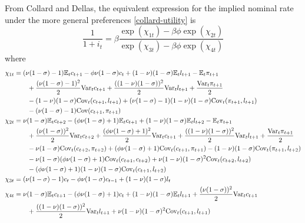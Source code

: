 From Collard and Dellas, the equivalent expression for the implied nominal rate under the more general preferences \eqref{collard-utility} is $$\frac{1}{1 + i_t} = \beta \frac{ \exp(\chi_{1t}) - \beta \phi \exp(\chi_{2t}) }{ \exp(\chi_{3t}) - \beta \phi \exp(\chi_{4t}) }$$ where
\begin{align*}
\chi_{1t} &= (\nu(1-\sigma)-1) \mathbb{E}_t c_{t+1} - \phi \nu(1-\sigma) c_t + (1-\nu)(1-\sigma) \mathbb{E}_t l_{t+1} - \mathbb{E}_t \pi_{t+1} \\
  &\qquad + \frac{(\nu(1-\sigma)-1)^2}{2} \mathrm{Var}_t c_{t+1} + \frac{((1-\nu)(1-\sigma))^2}{2} \mathrm{Var}_t l_{t+1} + \frac{\mathrm{Var}_t \pi_{t+1}}{2} \\
  &\qquad - (1-\nu)(1-\sigma) \mathrm{Cov}_t(c_{t+1}, l_{t+1}) + (\nu(1-\sigma)-1)(1-\nu)(1-\sigma) \mathrm{Cov}_t(\pi_{t+1}, l_{t+1}) \\
  &\qquad - (\nu(1-\sigma)-1) \mathrm{Cov}(c_{t+1}, \pi_{t+1}) \\
\chi_{2t} &= \nu(1-\sigma) \mathbb{E}_t c_{t+2} - (\phi\nu(1-\sigma)+1) \mathbb{E}_t c_{t+1} + (1-\nu)(1-\sigma) \mathbb{E}_t l_{t+2} - \mathbb{E}_t \pi_{t+1} \\
  &\qquad + \frac{(\nu(1-\sigma))^2}{2} \mathrm{Var}_t c_{t+2} + \frac{(\phi\nu(1-\sigma)+1)^2}{2} \mathrm{Var}_t c_{t+1} + \frac{((1-\nu)(1-\sigma))^2}{2} \mathrm{Var}_t l_{t+1} + \frac{\mathrm{Var}_t \pi_{t+1}}{2} \\
  &\qquad - \nu(1-\sigma) \mathrm{Cov}_t(c_{t+2}, \pi_{t+2}) + (\phi\nu(1-\sigma)+1) \mathrm{Cov}_t(c_{t+1}, \pi_{t+1}) - (1-\nu)(1-\sigma) \mathrm{Cov}_t(\pi_{t+1}, l_{t+2}) \\
  &\qquad - \nu(1-\sigma)(\phi\nu(1-\sigma)+1) \mathrm{Cov}_t(c_{t+1}, c_{t+2}) + \nu(1-\nu)(1-\sigma)^2 \mathrm{Cov}_t(c_{t+2}, l_{t+2}) \\
  &\qquad - (\phi\nu(1-\sigma)+1)(1-\nu)(1-\sigma) \mathrm{Cov}_t(c_{t+1}, l_{t+2}) \\
\chi_{3t} &= (\nu(1-\sigma)-1)c_t - \phi\nu(1-\sigma)c_{t-1} + (1-\nu)(1-\sigma)l_t \\
\chi_{4t} &= \nu(1-\sigma) \mathbb{E}_t c_{t+1} - (\phi\nu(1-\sigma)+1)c_t + (1-\nu)(1-\sigma) \mathbb{E}_t l_{t+1} + \frac{(\nu(1-\sigma))^2}{2} \mathrm{Var}_t c_{t+1} \\
  &\qquad + \frac{((1-\nu)(1-\sigma))^2}{2} \mathrm{Var}_t l_{t+1} + \nu(1-\nu)(1-\sigma)^2 \mathrm{Cov}_t(c_{t+1}, l_{t+1})
\end{align*}

